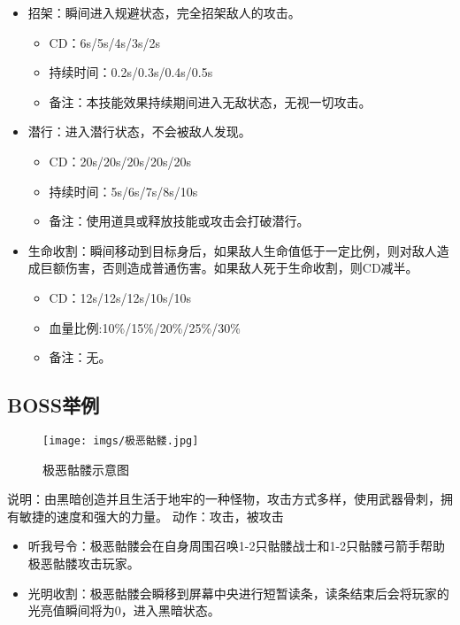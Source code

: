 \documentclass[UTF8,AutoFakeBold=1,AutoFakeSlant,zihao=-4]{cucthesis}
\begin{document}
\begin{itemize}
    \item 招架：瞬间进入规避状态，完全招架敌人的攻击。
    \begin{itemize}
        \item CD：6s/5s/4s/3s/2s
        \item 持续时间：0.2s/0.3s/0.4s/0.5s
        \item 备注：本技能效果持续期间进入无敌状态，无视一切攻击。
    \end{itemize}

    \item 潜行：进入潜行状态，不会被敌人发现。
    \begin{itemize}
        \item CD：20s/20s/20s/20s/20s
        \item 持续时间：5s/6s/7s/8s/10s
        \item 备注：使用道具或释放技能或攻击会打破潜行。
    \end{itemize}

    \item 生命收割：瞬间移动到目标身后，如果敌人生命值低于一定比例，则对敌人造成巨额伤害，否则造成普通伤害。如果敌人死于生命收割，则CD减半。
    \begin{itemize}
        \item CD：12s/12s/12s/10s/10s
        \item 血量比例:10\%/15\%/20\%/25\%/30\%
        \item 备注：无。
    \end{itemize}
\end{itemize}


\subsection{BOSS举例}
\begin{figure}[ht]
    \centering
    \texttt{[image: imgs/极恶骷髅.jpg]}    
    \caption{极恶骷髅示意图}
\end{figure}

说明：由黑暗创造并且生活于地牢的一种怪物，攻击方式多样，使用武器骨刺，拥有敏捷的速度和强大的力量。
动作：攻击，被攻击

\begin{itemize}
    \item 听我号令：极恶骷髅会在自身周围召唤1-2只骷髅战士和1-2只骷髅弓箭手帮助极恶骷髅攻击玩家。
    \item 光明收割：极恶骷髅会瞬移到屏幕中央进行短暂读条，读条结束后会将玩家的光亮值瞬间将为0，进入黑暗状态。
\end{itemize}
\end{document}
